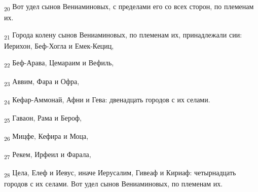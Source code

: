 \begin{tcolorbox}
\textsubscript{20} Вот удел сынов Вениаминовых, с пределами его со всех сторон, по племенам их.
\end{tcolorbox}
\begin{tcolorbox}
\textsubscript{21} Города колену сынов Вениаминовых, по племенам их, принадлежали сии: Иерихон, Беф-Хогла и Емек-Кециц,
\end{tcolorbox}
\begin{tcolorbox}
\textsubscript{22} Беф-Арава, Цемараим и Вефиль,
\end{tcolorbox}
\begin{tcolorbox}
\textsubscript{23} Аввим, Фара и Офра,
\end{tcolorbox}
\begin{tcolorbox}
\textsubscript{24} Кефар-Аммонай, Афни и Гева: двенадцать городов с их селами.
\end{tcolorbox}
\begin{tcolorbox}
\textsubscript{25} Гаваон, Рама и Бероф,
\end{tcolorbox}
\begin{tcolorbox}
\textsubscript{26} Мицфе, Кефира и Моца,
\end{tcolorbox}
\begin{tcolorbox}
\textsubscript{27} Рекем, Ирфеил и Фарала,
\end{tcolorbox}
\begin{tcolorbox}
\textsubscript{28} Цела, Елеф и Иевус, иначе Иерусалим, Гивеаф и Кириаф: четырнадцать городов с их селами. Вот удел сынов Вениаминовых, по племенам их.
\end{tcolorbox}
